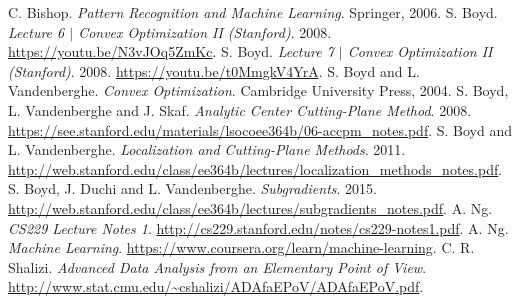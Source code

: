 \documentclass[11pt]{amsart}
\theoremstyle{definition}
\theoremstyle{remark}
\begin{document}
\renewcommand\refname{Bibliography}
\begin{thebibliography}{99}
     C. Bishop. \emph{Pattern Recognition and Machine Learning}. Springer, 2006.
    \bibitem[Boy08A] S. Boyd. \emph{Lecture 6 $|$ Convex Optimization II (Stanford)}. 2008. \url{https://youtu.be/N3vJOq5ZmKc}.
    \bibitem[Boy08B] S. Boyd. \emph{Lecture 7 $|$ Convex Optimization II (Stanford)}. 2008. \url{https://youtu.be/t0MmgkV4YrA}.
     S. Boyd and L. Vandenberghe. \emph{Convex Optimization}. Cambridge University Press, 2004.
     S. Boyd, L. Vandenberghe and J. Skaf. \emph{Analytic Center Cutting-Plane Method}. 2008. \url{https://see.stanford.edu/materials/lsocoee364b/06-accpm_notes.pdf}.
     S. Boyd and L. Vandenberghe. \emph{Localization and Cutting-Plane Methods}. 2011. \url{http://web.stanford.edu/class/ee364b/lectures/localization_methods_notes.pdf}.
     S. Boyd, J. Duchi and L. Vandenberghe. \emph{Subgradients}. 2015. \url{http://web.stanford.edu/class/ee364b/lectures/subgradients_notes.pdf}.
     A. Ng. \emph{CS229 Lecture Notes 1}. \url{http://cs229.stanford.edu/notes/cs229-notes1.pdf}.
     A. Ng. \emph{Machine Learning}. \url{https://www.coursera.org/learn/machine-learning}.
     C. R. Shalizi. \emph{Advanced Data Analysis
    from an Elementary Point of View}. \url{http://www.stat.cmu.edu/~cshalizi/ADAfaEPoV/ADAfaEPoV.pdf}. 
\end{thebibliography}




\end{document}
